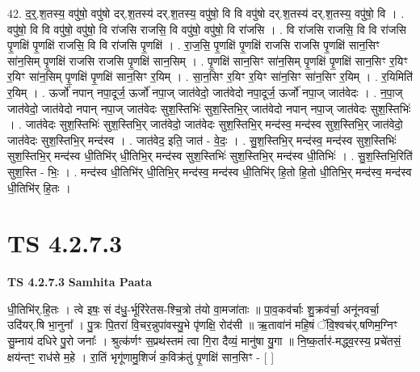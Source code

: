 \documentclass[17pt]{extarticle}
\begin{document}
42. द॒र्॒.श॒तस्य॒ वपु॑षो॒ वपु॑षो दर्.श॒तस्य॑ दर्.श॒तस्य॒ वपु॑षो॒ वि वि वपु॑षो दर्.श॒तस्य॑ दर्.श॒तस्य॒ वपु॑षो॒ वि । . वपु॑षो॒ वि वि वपु॑षो॒ वपु॑षो॒ वि रा॑जसि राजसि॒ वि वपु॑षो॒ वपु॑षो॒ वि रा॑जसि । . वि रा॑जसि राजसि॒ वि वि रा॑जसि पृ॒णक्षि॑ पृ॒णक्षि॑ राजसि॒ वि वि रा॑जसि पृ॒णक्षि॑ । . रा॒ज॒सि॒ पृ॒णक्षि॑ पृ॒णक्षि॑ राजसि राजसि पृ॒णक्षि॑ सान॒सिꣳ सा॑न॒सिम् पृ॒णक्षि॑ राजसि राजसि पृ॒णक्षि॑ सान॒सिम् । . पृ॒णक्षि॑ सान॒सिꣳ सा॑न॒सिम् पृ॒णक्षि॑ पृ॒णक्षि॑ सान॒सिꣳ र॒यिꣳ र॒यिꣳ सा॑न॒सिम् पृ॒णक्षि॑ पृ॒णक्षि॑ सान॒सिꣳ र॒यिम् । . सा॒न॒सिꣳ र॒यिꣳ र॒यिꣳ सा॑न॒सिꣳ सा॑न॒सिꣳ र॒यिम् । . र॒यिमिति॑ र॒यिम् । . ऊर्जो॑ नपान् नपा॒दूर्ज॒ ऊर्जो॑ नपा॒ज् जात॑वेदो॒ जात॑वेदो नपा॒दूर्ज॒ ऊर्जो॑ नपा॒ज् जात॑वेदः । . न॒पा॒ज् जात॑वेदो॒ जात॑वेदो नपान् नपा॒ज् जात॑वेदः सुश॒स्तिभिः॑ सुश॒स्तिभि॒र् जात॑वेदो नपान् नपा॒ज् जात॑वेदः सुश॒स्तिभिः॑ । . जात॑वेदः सुश॒स्तिभिः॑ सुश॒स्तिभि॒र् जात॑वेदो॒ जात॑वेदः सुश॒स्तिभि॒र् मन्द॑स्व॒ मन्द॑स्व सुश॒स्तिभि॒र् जात॑वेदो॒ जात॑वेदः सुश॒स्तिभि॒र् मन्द॑स्व । . जात॑वेद॒ इति॒ जात॑ - वे॒दः॒ । . सु॒श॒स्तिभि॒र् मन्द॑स्व॒ मन्द॑स्व सुश॒स्तिभिः॑ सुश॒स्तिभि॒र् मन्द॑स्व धी॒तिभि॑र् धी॒तिभि॒र् मन्द॑स्व सुश॒स्तिभिः॑ सुश॒स्तिभि॒र् मन्द॑स्व धी॒तिभिः॑ । . सु॒श॒स्तिभि॒रिति॑ सुश॒स्ति - भिः॒ । . मन्द॑स्व धी॒तिभि॑र् धी॒तिभि॒र् मन्द॑स्व॒ मन्द॑स्व धी॒तिभि॑र् हि॒तो हि॒तो धी॒तिभि॒र् मन्द॑स्व॒ मन्द॑स्व धी॒तिभि॑र् हि॒तः । \newline
\pagebreak
{}

\section{ TS 4.2.7.3 }

\textbf{TS 4.2.7.3 } \newline
\textbf{Samhita Paata} \newline

धी॒तिभि॑र्.हि॒तः । त्वे इषः॒ सं द॑धु॒-र्भूरि॑रेतस-श्चि॒त्रो त॑यो वा॒मजा॑ताः ॥ पा॒व॒कव॑र्चाः शु॒क्रव॑र्चा॒ अनू॑नवर्चा॒ उदि॑यर्.षि भा॒नुना᳚ । पु॒त्रः पि॒तरा॑ वि॒चर॒न्नुपा॑वस्यु॒भे पृ॑णक्षि॒ रोद॑सी ॥ ऋ॒तावा॑नं महि॒षं ॅवि॒श्वच॑र्.षणिम॒ग्निꣳ सु॒म्नाय॑ दधिरे पु॒रो जनाः᳚ । श्रुत्क॑र्णꣳ स॒प्रथ॑स्तमं त्वा गि॒रा दैव्यं॒ मानु॑षा यु॒गा ॥ नि॒ष्क॒र्तार॑-मद्ध्व॒रस्य॒ प्रचे॑तसं॒ क्षय॑न्तꣳ॒॒ राध॑से म॒हे । रा॒तिं भृगू॑णामु॒शिजं॑ क॒विक्र॑तुं पृ॒णक्षि॑ सान॒सिꣳ - [  ] \newline
\end{document}
